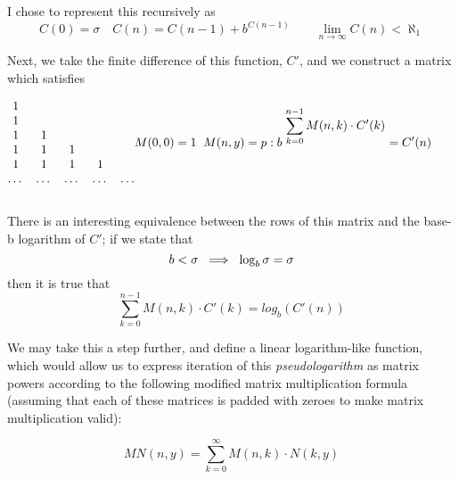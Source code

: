 \documentclass{article}
\begin{document}
\noindent I chose to represent this recursively as \begin{equation}C(0) = \sigma \quad C(n) = C(n-1) + b^{C(n-1)} \qquad \lim_{n \rightarrow \infty} C(n) < \aleph_1 \end{equation}

\noindent Next, we take the finite difference of this function, $C'$, and we construct a matrix which satisfies

\begin{equation}\begin{matrix}
    1 \\
    1 \\
    1  & 1 \\
    1 & 1 & 1 \\
    1 & 1 & 1 & 1 \\
    \dots & \dots & \dots & \dots & \dots \\
\end{matrix}
M(0, 0) = 1 \hspace{2mm} M(n, y) = p : b^{\hspace{1mm} \displaystyle \sum_{k=0}^{n-1} M(n, k) \cdot C'(k)} = C'(n) \qquad\end{equation}\\

\noindent There is an interesting equivalence between the rows of this matrix and the base-b logarithm of $C'$; if we state that \begin{equation}b < \sigma \hspace{1mm} \implies \hspace{1mm} \log_b \sigma = \sigma\end{equation} then it is true that \begin{equation}\displaystyle \sum_{k=0}^{n-1} M(n, k) \cdot C'(k) = log_b(C'(n))\end{equation}

\noindent We may take this a step further, and define a linear logarithm-like function, which would allow us to express iteration of this \textit{pseudologarithm} as matrix powers according to the following modified matrix multiplication formula (assuming that each of these matrices is padded with zeroes to make matrix multiplication valid):

$$MN (n, y) = \sum_{k=0}^{\infty} M(n, k) \cdot N(k, y)$$
\end{document}
